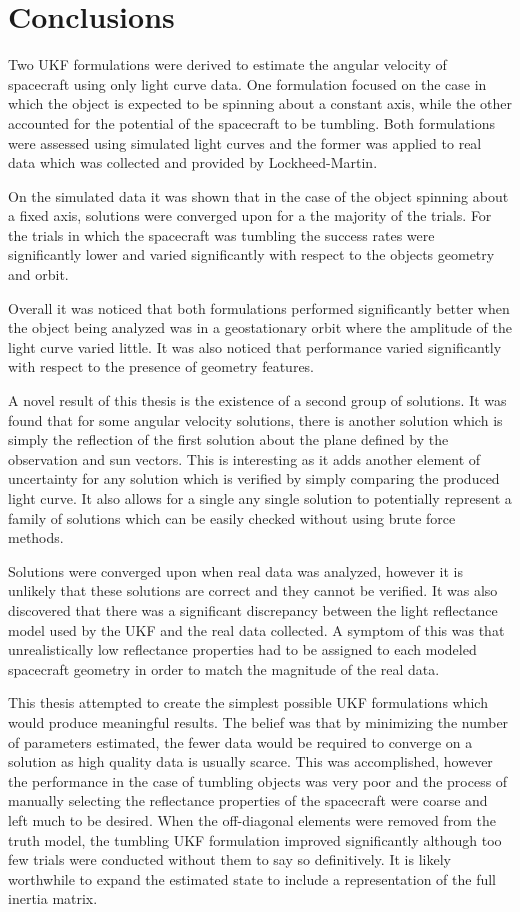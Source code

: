 \chapter{Conclusions}

Two UKF formulations were derived to estimate the angular velocity of spacecraft using only light curve data. One formulation focused on the case in which the object is expected to be spinning about a constant axis, while the other accounted for the potential of the spacecraft to be tumbling. Both formulations were assessed using simulated light curves and the former was applied to real data which was collected and provided by Lockheed-Martin. 

On the simulated data it was shown that in the case of the object spinning about a fixed axis, solutions were converged upon for a the majority of the trials. For the trials in which the spacecraft was tumbling the success rates were significantly lower and varied significantly with respect to the objects geometry and orbit. 

Overall it was noticed that both formulations performed significantly better when the object being analyzed was in a geostationary orbit where the amplitude of the light curve varied little. It was also noticed that performance varied significantly with respect to the presence of geometry features. 

A novel result of this thesis is the existence of a second group of solutions. It was found that for some angular velocity solutions, there is another solution which is simply the reflection of the first solution about the plane defined by the observation and sun vectors. This is interesting as it adds another element of uncertainty for any solution which is verified by simply comparing the produced light curve. It also allows for a single any single solution to potentially represent a family of solutions which can be easily checked without using brute force methods.

Solutions were converged upon when real data was analyzed, however it is unlikely that these solutions are correct and they cannot be verified. It was also discovered that there was a significant discrepancy between the light reflectance model used by the UKF and the real data collected. A symptom of this was that unrealistically low reflectance properties had to be assigned to each modeled spacecraft geometry in order to match the magnitude of the real data.

This thesis attempted to create the simplest possible UKF formulations which would produce meaningful results. The belief was that by minimizing the number of parameters estimated, the fewer data would be required to converge on a solution as high quality data is usually scarce. This was accomplished, however the performance in the case of tumbling objects was very poor and the process of manually selecting the reflectance properties of the spacecraft were coarse and left much to be desired. When the off-diagonal elements were removed from the truth model, the tumbling UKF formulation improved significantly although too few trials were conducted without them to say so definitively. It is likely worthwhile to expand the estimated state to include a representation of the full inertia matrix.


